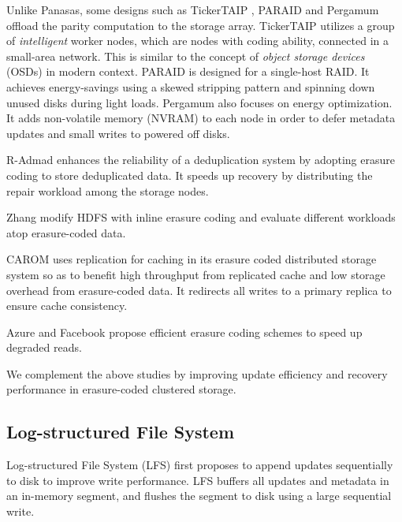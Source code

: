 Unlike Panasas, some designs such as TickerTAIP \cite{cao94}, PARAID
\cite{weddle07} and Pergamum \cite{storer08} offload the parity computation to
the storage array. TickerTAIP utilizes a group of \textit{intelligent} worker
nodes, which are nodes with coding ability, connected in a small-area network.
This is similar to the concept of \textit{object storage devices} (OSDs) in
modern context. PARAID is designed for a single-host RAID. It achieves
energy-savings using a skewed stripping pattern and spinning down unused disks
during light loads. Pergamum also focuses on energy optimization. It adds
non-volatile memory (NVRAM) to each node in order to defer metadata updates and
small writes to powered off disks.

R-Admad \cite{liu09} enhances the reliability of a deduplication
system by adopting erasure coding to store deduplicated data. It speeds up
recovery by distributing the repair workload among the storage nodes.

Zhang \etal \cite{zhang10} modify HDFS with inline erasure coding and
evaluate different workloads atop erasure-coded data.

CAROM \cite{ma13} uses replication for caching in its erasure coded distributed
storage system so as to benefit high throughput from replicated cache and low
storage overhead from erasure-coded data. It redirects all writes to a primary
replica to ensure cache consistency. 

Azure \cite{huang12} and Facebook \cite{sathiamoorthy13} propose efficient
erasure coding schemes to speed up degraded reads. 

We complement the above studies by improving update efficiency and recovery
performance in erasure-coded clustered storage. 


\subsection{Log-structured File System}


Log-structured File System (LFS) \cite{rosenblum92} first proposes to append
updates sequentially to disk to improve write performance. LFS buffers all 
updates and metadata in an in-memory segment, and flushes the segment to disk
using a large sequential write.

